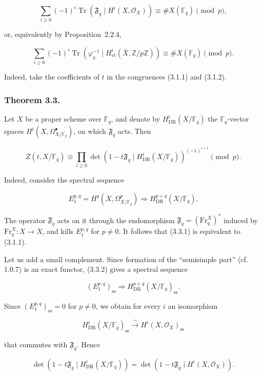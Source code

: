 \begin{equation}\tag{3.2.1}
\sum_{i\geq0}(-1)^i
\operatorname{Tr}\!\left(\mathfrak F_q\mid H^i(X,\mathcal O_X)\right)
\equiv \#X(\mathbb F_q)\pmod p,
\end{equation}

or, equivalently by Proposition~2.2.4,

\begin{equation}\tag{3.2.2}
\sum_{i\geq0}(-1)^i
\operatorname{Tr}\!\left(\varphi_q^{-1}\mid
H^i_{\mathrm{et}}(\bar X,\mathbb Z/p\mathbb Z)\right)
\equiv \#X(\mathbb F_q)\pmod p.
\end{equation}

Indeed, take the coefficients of $t$ in the congruences (3.1.1) and (3.1.2).

\subsubsection*{Theorem 3.3.}
Let $X$ be a proper scheme over $\mathbb F_q$, and denote by
$H^i_{\mathrm{DR}}(X/\mathbb F_q)$ the $\mathbb F_q$-vector spaces
$H^i(X,\Omega^\bullet_{X/\mathbb F_q})$, on which $\mathfrak F_q$ acts. Then

\begin{equation}\tag{3.3.1}
Z(t,X/\mathbb F_q)
\equiv
\prod_{i\geq0}
\det\!\left(1-t\mathfrak F_q\mid
H^i_{\mathrm{DR}}(X/\mathbb F_q)\right)^{(-1)^{i+1}}
\pmod p.
\end{equation}

Indeed, consider the spectral sequence

\begin{equation}\tag{3.3.2}
E_1^{p,q}=H^q(X,\Omega^p_{X/\mathbb F_q})
\Longrightarrow H^{p+q}_{\mathrm{DR}}(X/\mathbb F_q).
\end{equation}

The operator $\mathfrak F_q$ acts on it through the endomorphism
$\mathfrak F_q=(\mathrm{Fr}_q^X)^*$ induced by
$\mathrm{Fr}_q^X:X\longrightarrow X$, and kills $E_1^{p,q}$ for $p\ne0$.
It follows that (3.3.1) is equivalent to (3.1.1).

Let us add a small complement. Since formation of the ``semisimple part''
(cf. 1.0.7) is an exact functor, (3.3.2) gives a spectral sequence

\begin{equation}\tag{3.3.3}
(E_1^{p,q})_{\mathrm{ss}}
\Longrightarrow H^{p+q}_{\mathrm{DR}}(X/\mathbb F_q)_{\mathrm{ss}}.
\end{equation}

Since $(E_1^{p,q})_{\mathrm{ss}}=0$ for $p\ne0$, we obtain for every $i$ an
isomorphism

\begin{equation}\tag{3.3.4}
H^i_{\mathrm{DR}}(X/\mathbb F_q)_{\mathrm{ss}}
\xrightarrow{\ \sim\ }
H^i(X,\mathcal O_X)_{\mathrm{ss}}
\end{equation}

that commutes with $\mathfrak F_q$. Hence

\begin{equation}\tag{3.3.5}
\det\!\left(1-t\mathfrak F_q\mid H^i_{\mathrm{DR}}(X/\mathbb F_q)\right)
=
\det\!\left(1-t\mathfrak F_q\mid H^i(X,\mathcal O_X)\right).
\end{equation}
